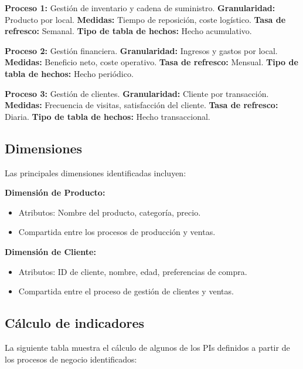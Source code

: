 \documentclass[12pt]{opticajnl}
\begin{document}
\textbf{Proceso 1:} Gestión de inventario y cadena de suministro.  
\textbf{Granularidad:} Producto por local.  
\textbf{Medidas:} Tiempo de reposición, coste logístico.  
\textbf{Tasa de refresco:} Semanal.  
\textbf{Tipo de tabla de hechos:} Hecho acumulativo.

\textbf{Proceso 2:} Gestión financiera.  
\textbf{Granularidad:} Ingresos y gastos por local.  
\textbf{Medidas:} Beneficio neto, coste operativo.  
\textbf{Tasa de refresco:} Mensual.  
\textbf{Tipo de tabla de hechos:} Hecho periódico.

\textbf{Proceso 3:} Gestión de clientes.  
\textbf{Granularidad:} Cliente por transacción.  
\textbf{Medidas:} Frecuencia de visitas, satisfacción del cliente.  
\textbf{Tasa de refresco:} Diaria.  
\textbf{Tipo de tabla de hechos:} Hecho transaccional.

\subsection{Dimensiones}
Las principales dimensiones identificadas incluyen:

\textbf{Dimensión de Producto:} 
\begin{itemize}
    \item Atributos: Nombre del producto, categoría, precio.
    \item Compartida entre los procesos de producción y ventas.
\end{itemize}

\textbf{Dimensión de Cliente:} 
\begin{itemize}
    \item Atributos: ID de cliente, nombre, edad, preferencias de compra.
    \item Compartida entre el proceso de gestión de clientes y ventas.
\end{itemize}

\subsection{Cálculo de indicadores}

La siguiente tabla muestra el cálculo de algunos de los PIs definidos a partir de los procesos de negocio identificados:
\end{document}
